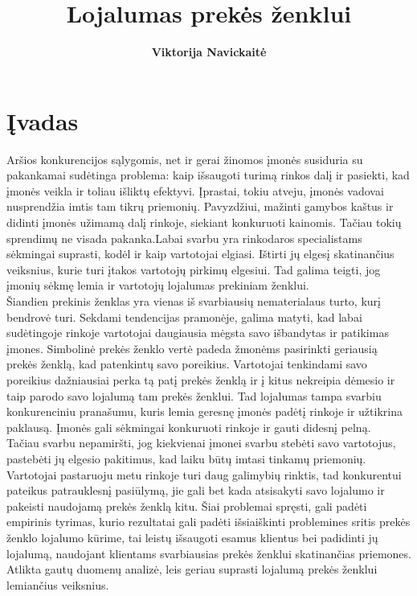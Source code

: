 \documentclass[12pt,titlepage]{article}
\title{\textbf{Lojalumas prekės ženklui}}
\author{\textbf{Viktorija Navickaitė}}
\begin{document}
\maketitle
\tableofcontents
\newpage

\section{Įvadas}

\justify
\hspace{\parindent} Aršios konkurencijos sąlygomis, net ir gerai žinomos įmonės susiduria su pakankamai sudėtinga problema: kaip išsaugoti turimą rinkos dalį ir pasiekti, kad įmonės veikla ir toliau išliktų efektyvi. Įprastai, tokiu atveju, įmonės vadovai nusprendžia imtis tam tikrų priemonių. Pavyzdžiui, mažinti gamybos kaštus ir didinti įmonės užimamą dalį rinkoje, siekiant konkuruoti kainomis. Tačiau tokių sprendimų ne visada pakanka.Labai  svarbu yra rinkodaros specialistams sėkmingai suprasti, kodėl ir kaip vartotojai elgiasi. Ištirti jų elgesį skatinančius veiksnius, kurie turi įtakos vartotojų pirkimų elgesiui. Tad galima teigti, jog įmonių sėkmę lemia ir vartotojų lojalumas prekiniam ženklui.\\

Šiandien prekinis ženklas yra vienas iš svarbiausių nematerialaus turto, kurį bendrovė turi. Sekdami tendencijas pramonėje, galima matyti, kad labai sudėtingoje rinkoje vartotojai daugiausia mėgsta savo išbandytas ir patikimas įmones. Simbolinė prekės ženklo vertė padeda žmonėms pasirinkti geriausią prekės ženklą, kad patenkintų savo poreikius.\parencite{alamgir2011influence} Vartotojai tenkindami savo poreikius dažniausiai perka tą patį prekės ženklą ir į kitus nekreipia dėmesio ir taip parodo savo lojalumą tam prekės ženklui. Tad lojalumas tampa svarbiu konkurenciniu pranašumu, kuris lemia geresnę įmonės padėtį rinkoje ir užtikrina paklausą. Įmonės gali sėkmingai konkuruoti rinkoje ir gauti didesnį pelną.\\

Tačiau svarbu nepamiršti, jog kiekvienai įmonei svarbu stebėti savo vartotojus, pastebėti jų elgesio pakitimus, kad laiku būtų imtasi tinkamų priemonių. Vartotojai pastaruoju metu rinkoje turi daug galimybių rinktis, tad konkurentui pateikus patrauklesnį pasiūlymą, jie gali bet kada atsisakyti savo lojalumo ir pakeisti naudojamą prekės ženklą kitu.  Šiai problemai spręsti, gali padėti empirinis tyrimas, kurio rezultatai gali padėti išsiaiškinti problemines sritis prekės ženklo lojalumo kūrime, tai leistų išsaugoti esamus klientus bei padidinti jų lojalumą, naudojant klientams svarbiausias prekės ženklui skatinančias priemones. Atlikta gautų duomenų analizė, leis geriau suprasti lojalumą prekės ženklui lemiančius veiksnius.
\justify
\end{document}
